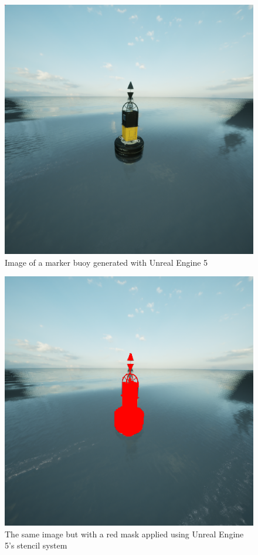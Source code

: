 \documentclass{article}
\begin{document}
\begin{figure}[h]
  \centering
  \begin{minipage}[b]{0.9\linewidth}
    \includegraphics[width=\linewidth]{Images/BP_CM_East_15536.png}
    \caption{Image of a marker buoy generated with Unreal Engine 5}
    \label{fig:image2}
  \end{minipage}
\end{figure}

\begin{figure}[h]
  \centering
  \begin{minipage}[b]{0.9\linewidth}
    \includegraphics[width=\linewidth]{Images/BP_CM_East_15534.png}
    \caption{The same image but with a red mask applied using Unreal Engine 5's stencil system}
    \label{fig:image3}
  \end{minipage}
\end{figure}
\end{document}

